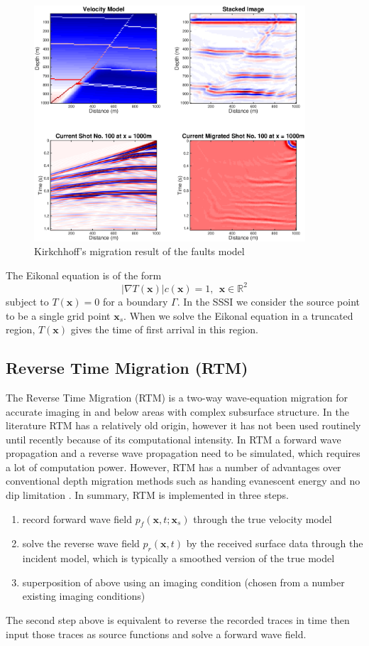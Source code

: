 \documentclass[11pt]{article}
\newcommand{\real}{\mathbb{R}}
\newcommand{\bx}{\boldsymbol{x}}
\theoremstyle{plain}
\theoremstyle{definition}
\theoremstyle{remark}
\numberwithin{equation}{section}
\begin{document}
\begin{figure}[htbp]\label{fig:kirc}
\centering
\includegraphics[width=0.9\textwidth]{Fig/kirc.eps}
\caption{Kirkchhoff's migration result of the faults model}
\end{figure}

The Eikonal equation is of the form
\begin{equation}
|\nabla T(\bx)| c(\bx)= 1, ~~\bx\in \real^2
\end{equation}
subject to $T(\bx) = 0$ for a boundary $\Gamma$. In the SSSI we consider the source point to be a single 
grid point $\bx_s$. When we solve the Eikonal equation in a truncated region, $T(\bx)$ gives the time of 
first arrival in this region. 


\subsection{Reverse Time Migration (RTM)}
The Reverse Time Migration (RTM) is a two-way wave-equation migration for accurate imaging in and below areas with complex subsurface structure. In the literature RTM has a relatively old origin, however it has not been used routinely until recently because of its
computational intensity. In RTM a forward wave propagation and a reverse wave propagation need to be 
simulated, which requires a lot of computation power. However, RTM has a number of advantages over conventional depth migration methods such as 
handing evanescent energy and no dip limitation \cite{McMechan:1983aa, Baysal:1983aa}. In summary, RTM is implemented in three steps. 
\begin{enumerate}
\item record forward wave field $p_f(\bx, t; \bx_s)$ through the true velocity model
\item solve the reverse wave field $p_r(\bx, t)$ by the received surface data through the incident model, which is typically a smoothed version of the true model
\item superposition of above using an imaging condition (chosen from a number existing imaging conditions)
\end{enumerate}
The second step above is equivalent to reverse the recorded traces in time then input those traces as source functions and solve a forward wave field. 
\end{document}
